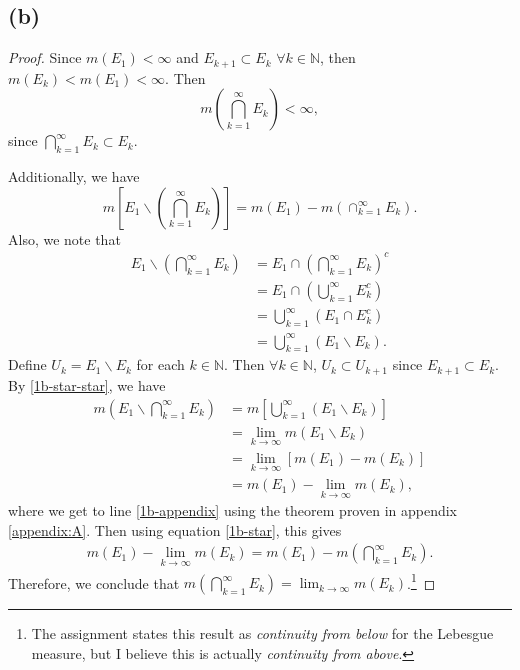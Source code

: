 \documentclass{article}
\newcommand{\N}{\mathbb{N}} %
\begin{document}
\subsection*{(b)}
\begin{proof}
	Since $m(E_1) < \infty$ and $E_{k+1} \subset E_k$ $\forall k \in \N$, then $m(E_k) < m(E_1) < \infty$. Then
	\begin{equation}
		m\left(\bigcap_{k=1}^{\infty} E_k \right) < \infty,
	\end{equation}
	since $\bigcap_{k=1}^{\infty} E_k \subset E_k$.
	
	Additionally, we have
	\begin{equation}\label{1b-star}
		m\left[E_1 \backslash \left(\bigcap_{k=1}^{\infty}E_k\right)\right] = m(E_1) - m\left(\cap_{k=1}^{\infty}E_k\right).
	\end{equation}
	Also, we note that
	\begin{align}
		E_1 \backslash \left(\bigcap_{k=1}^{\infty} E_k \right) &= E_1 \cap \left(\bigcap_{k=1}^{\infty}E_k\right)^c \\
		&= E_1 \cap \left(\bigcup_{k=1}^{\infty} E_k^c\right) \\
		&= \bigcup_{k=1}^{\infty} \left(E_1 \cap E_k^c\right) \\
		&= \bigcup_{k=1}^{\infty}\left(E_1 \backslash E_k \right). \label{1b-star-star}
	\end{align}
	Define $U_k = E_1 \backslash E_k$ for each $k \in \N$. Then $\forall k \in \N$, $U_k \subset U_{k+1}$ since $E_{k+1} \subset E_k$. By \eqref{1b-star-star}, we have
	\begin{align}
		m\left(E_1 \backslash \bigcap_{k=1}^{\infty}E_k\right) &= m\left[\bigcup_{k=1}^{\infty}(E_1 \backslash E_k)\right] \\
		&= \lim_{k \to \infty} m(E_1 \backslash E_k) \label{1b-appendix}\\
		&= \lim_{k \to \infty} \left[m(E_1) - m(E_k)\right] \\
		&= m(E_1) - \lim_{k \to \infty}m(E_k),
	\end{align}
	where we get to line \eqref{1b-appendix} using the theorem proven in appendix \ref{appendix:A}. Then using equation \eqref{1b-star}, this gives
	\begin{align}
		m(E_1) - \lim_{k \to \infty} m(E_k) = m(E_1) - m\left(\bigcap_{k=1}^{\infty} E_k \right).
	\end{align}
	Therefore, we conclude that $m\left(\bigcap_{k=1}^{\infty}E_k\right) = \lim_{k \to \infty} m(E_k)$.\footnote{The assignment states this result as \textit{continuity from below} for the Lebesgue measure, but I believe this is actually \textit{continuity from above}.}
\end{proof}
\end{document}
